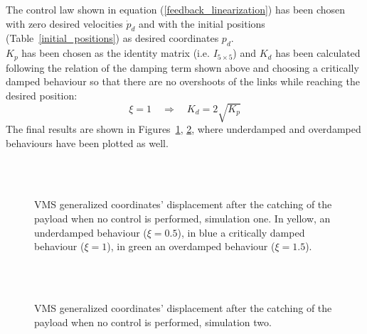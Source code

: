 \documentclass[a4paper,12pt,oneside]{report}
\begin{document}
The control law shown in equation (\ref{feedback_linearization}) has been chosen with zero desired velocities $\dot{p}_d$ and with the initial positions (Table~\ref{initial_positions}) as desired coordinates $p_d$.\\
$K_p$ has been chosen as the identity matrix (i.e. $I_{5\times 5}$) and $K_d$ has been calculated following the relation of the damping term shown above and choosing a critically damped behaviour so that there are no overshoots of the links while reaching the desired position:
\begin{equation}
  \xi=1 \quad \Rightarrow \quad K_d=2\sqrt{K_p}
  \label{critically_damped}
\end{equation}
The final results are shown in Figures~\ref{controlled_motion_1}, \ref{controlled_motion_2}, where underdamped and overdamped behaviours have been plotted as well.
\begin{figure}
  \centering
  \subfloat
  {}\quad
\subfloat
  {} \\
  \subfloat
  {}\quad
  \subfloat
  {
  \label{q1_real}}\\
  \subfloat
  {}
  \caption{VMS generalized coordinates' displacement after the catching of the payload when no control is performed, simulation one. In yellow, an underdamped behaviour ($\xi=0.5$), in blue a critically damped behaviour ($\xi=1$), in green an overdamped behaviour ($\xi=1.5$).}
  \label{controlled_motion_1}
\end{figure}
\begin{figure}
  \centering
  \subfloat
  {}\quad
\subfloat
  {} \\
  \subfloat
  {}\quad
  \subfloat
  {}\\
  \subfloat
  {}
  \caption{VMS generalized coordinates' displacement after the catching of the payload when no control is performed, simulation two.}
  \label{controlled_motion_2}
\end{figure}
\newpage
\end{document}
